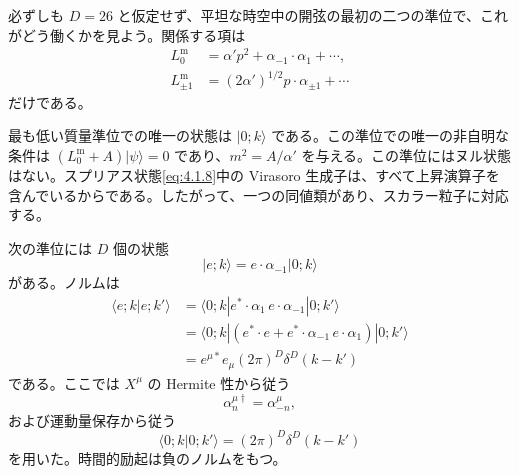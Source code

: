 必ずしも $D=26$ と仮定せず、平坦な時空中の開弦の最初の二つの準位で、これがどう働くかを見よう。関係する項は
\begin{align}
L^{\mathrm m}_0&=\alpha'p^2+\alpha_{-1}\cdot\alpha_1+\cdots,
\tag{4.1.11a}\label{eq:4.1.11a}\\
L^{\mathrm m}_{\pm1}&=(2\alpha')^{1/2}p\cdot\alpha_{\pm1}+\cdots
\tag{4.1.11b}\label{eq:4.1.11b}
\end{align}
だけである。

最も低い質量準位での唯一の状態は $|0;k\rangle$ である。この準位での唯一の非自明な条件は $(L^{\mathrm m}_0+A)|\psi\rangle=0$ であり、$m^2=A/\alpha'$ を与える。この準位にはヌル状態はない。スプリアス状態\eqref{eq:4.1.8}中の Virasoro 生成子は、すべて上昇演算子を含んでいるからである。したがって、一つの同値類があり、スカラー粒子に対応する。

次の準位には $D$ 個の状態
\begin{equation}
|e;k\rangle=e\cdot\alpha_{-1}|0;k\rangle
\tag{4.1.12}\label{eq:4.1.12}
\end{equation}
がある。ノルムは
\begin{equation}
\begin{aligned}
\langle e;k|e;k'\rangle
&=\langle0;k|e^*\cdot\alpha_1\,e\cdot\alpha_{-1}|0;k'\rangle\\
&=\langle0;k|(e^*\cdot e+e^*\cdot\alpha_{-1}\,e\cdot\alpha_1)|0;k'\rangle\\
&=e^{\mu*}e_\mu(2\pi)^D\delta^D(k-k')
\end{aligned}
\tag{4.1.13}\label{eq:4.1.13}
\end{equation}
である。ここでは $X^\mu$ の Hermite 性から従う
\begin{equation}
\alpha^{\mu\dagger}_n=\alpha^\mu_{-n},
\tag{4.1.14}\label{eq:4.1.14}
\end{equation}
および運動量保存から従う
\begin{equation}
\langle0;k|0;k'\rangle=(2\pi)^D\delta^D(k-k')
\tag{4.1.15}\label{eq:4.1.15}
\end{equation}
を用いた。時間的励起は負のノルムをもつ。

